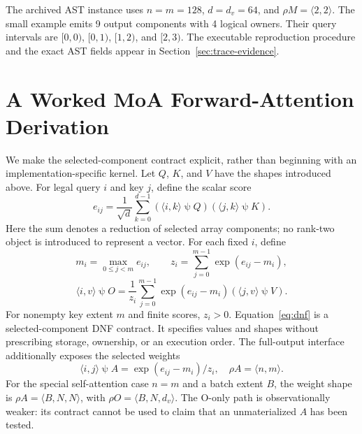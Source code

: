 \documentclass[sigplan,10pt,review,balance=false,pbalance=false]{acmart}
\newcommand{\ps}{\mathbin{\psi}}
\begin{document}
The archived AST instance uses $n=m=128$, $d=d_v=64$, and $\rho M=\langle2,2\rangle$. The small example emits 9 output components with 4 logical owners. Their query intervals are $[0,0)$, $[0,1)$, $[1,2)$, and $[2,3)$. The executable reproduction procedure and the exact AST fields appear in Section~\ref{sec:trace-evidence}.

\section{A Worked MoA Forward-Attention Derivation}
We make the selected-component contract explicit, rather than beginning with an implementation-specific kernel. Let $Q$, $K$, and $V$ have the shapes introduced above. For legal query $i$ and key $j$, define the scalar score
\begin{equation}
 e_{ij}=\frac{1}{\sqrt d}\sum_{k=0}^{d-1}
 (\langle i,k\rangle\ps Q)(\langle j,k\rangle\ps K).
\end{equation}
Here the sum denotes a reduction of selected array components; no rank-two object is introduced to represent a vector. For each fixed $i$, define
\begin{equation}
 m_i=\max_{0\le j<m}e_{ij},\qquad
 z_i=\sum_{j=0}^{m-1}\exp(e_{ij}-m_i),
\end{equation}
\begin{equation}
 \langle i,v\rangle\ps O=\frac{1}{z_i}\sum_{j=0}^{m-1}
 \exp(e_{ij}-m_i)(\langle j,v\rangle\ps V).
 \label{eq:dnf}
\end{equation}
For nonempty key extent $m$ and finite scores, $z_i>0$. Equation~\eqref{eq:dnf} is a selected-component DNF contract. It specifies values and shapes without prescribing storage, ownership, or an execution order. The full-output interface additionally exposes the selected weights
\begin{equation}
 \langle i,j\rangle\ps A=\exp(e_{ij}-m_i)/z_i,
 \quad\rho A=\langle n,m\rangle.
\end{equation}
For the special self-attention case $n=m$ and a batch extent $B$, the weight shape is $\rho A=\langle B,N,N\rangle$, with $\rho O=\langle B,N,d_v\rangle$. The O-only path is observationally weaker: its contract cannot be used to claim that an unmaterialized $A$ has been tested.
\end{document}
